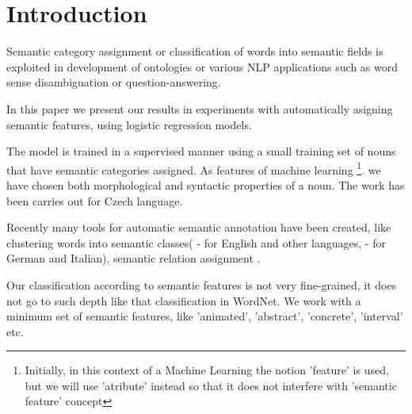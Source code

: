 \documentclass[letterpaper]{article}
\begin{document}
%
\title{}
\maketitle
\begin{abstract}
\begin{quote}
\end{quote}
\end{abstract}


\section{Introduction}
Semantic category assignment or classification of words into semantic fields 
is exploited in development of ontologies or various NLP applications such as 
word sense disambiguation or question-answering.

In this paper we present our results in experiments with automatically asigning semantic features,
using logistic regression models.

The model is trained in a supervised manner
using a small training set of nouns that have semantic categories assigned. 
As features of machine learning \footnote{Initially, in this context of a Machine Learning the notion 'feature'
is used, but we will use 'atribute' instead so that it does not interfere with 'semantic feature' concept}.
we have chosen both morphological and syntactic properties of a noun.
The work has been carries out for Czech language.

Recently many tools for automatic semantic annotation have been created, like
clustering words into semantic classes(\cite{wordnet} - for English and other languages,
\cite{baroni:2009} - for German and Italian), semantic relation assignment \cite{peirsman}.

Our classification according to semantic features is not very fine-grained,
it does not go to such depth like that classification
in WordNet. We work with a minimum set of semantic features, like 'animated',
'abstract', 'concrete', 'interval' etc. 
\end{document}
